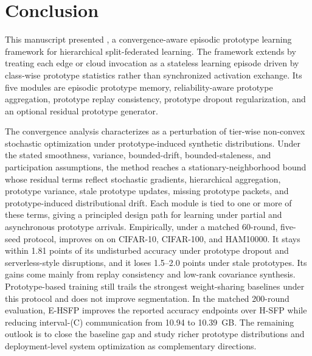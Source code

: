 \section{Conclusion}
\label{sec:conclusion}

This manuscript presented \ehsfp, a convergence-aware episodic prototype learning framework for hierarchical split-federated learning. The framework extends \hsfp by treating each edge or cloud invocation as a stateless learning episode driven by class-wise prototype statistics rather than synchronized activation exchange. Its five modules are episodic prototype memory, reliability-aware prototype aggregation, prototype replay consistency, prototype dropout regularization, and an optional residual prototype generator.

The convergence analysis characterizes \ehsfp as a perturbation of tier-wise non-convex stochastic optimization under prototype-induced synthetic distributions. Under the stated smoothness, variance, bounded-drift, bounded-staleness, and participation assumptions, the method reaches a stationary-neighborhood bound whose residual terms reflect stochastic gradients, hierarchical aggregation, prototype variance, stale prototype updates, missing prototype packets, and prototype-induced distributional drift. Each module is tied to one or more of these terms, giving a principled design path for learning under partial and asynchronous prototype arrivals. Empirically, under a matched 60-round, five-seed protocol, \ehsfp improves on \hsfp on CIFAR-10, CIFAR-100, and HAM10000. It stays within 1.81 points of its undisturbed accuracy under prototype dropout and serverless-style disruptions, and it loses 1.5--2.0 points under stale prototypes. Its gains come mainly from replay consistency and low-rank covariance synthesis. Prototype-based training still trails the strongest weight-sharing baselines under this protocol and does not improve segmentation. In the matched 200-round evaluation, E-HSFP improves the reported accuracy endpoints over H-SFP while reducing interval-(C) communication from 10.94 to 10.39~GB. The remaining outlook is to close the baseline gap and study richer prototype distributions and deployment-level system optimization as complementary directions.
